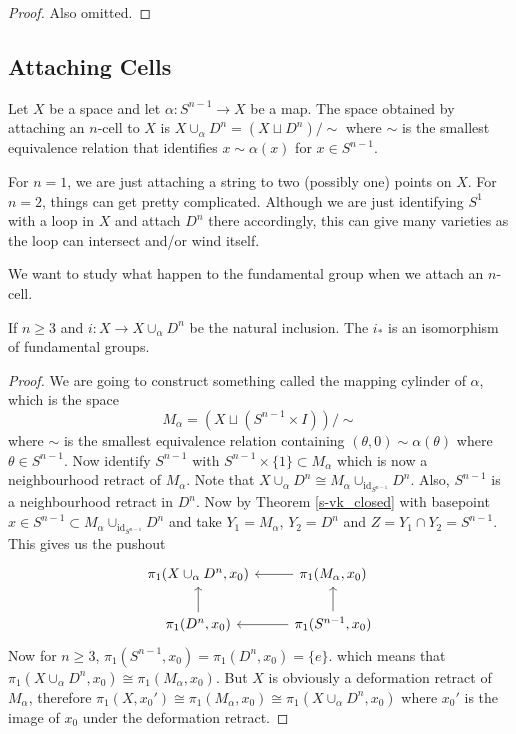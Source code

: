 \begin{proof}
    Also omitted.
\end{proof}
\subsection{Attaching Cells}
\begin{definition}
    Let $X$ be a space and let $\alpha:S^{n-1}\to X$ be a map.
    The space obtained by attaching an $n$-cell to $X$ is $X\cup_\alpha D^n=(X\sqcup D^n)/\sim$ where $\sim$ is the smallest equivalence relation that identifies $x\sim \alpha(x)$ for $x\in S^{n-1}$.
\end{definition}
\begin{example}
    For $n=1$, we are just attaching a string to two (possibly one) points on $X$.
    For $n=2$, things can get pretty complicated.
    Although we are just identifying $S^1$ with a loop in $X$ and attach $D^n$ there accordingly, this can give many varieties as the loop can intersect and/or wind itself.
\end{example}
We want to study what happen to the fundamental group when we attach an $n$-cell.
\begin{lemma}
    If $n\ge 3$ and $i:X\to X\cup_\alpha D^n$ be the natural inclusion.
    The $i_\ast$ is an isomorphism of fundamental groups.
\end{lemma}
\begin{proof}
    We are going to construct something called the mapping cylinder of $\alpha$, which is the space
    $$M_\alpha=(X\sqcup(S^{n-1}\times I))/\sim$$
    where $\sim$ is the smallest equivalence relation containing $(\theta,0)\sim\alpha(\theta)$ where $\theta\in S^{n-1}$.
    Now identify $S^{n-1}$ with $S^{n-1}\times \{1\}\subset M_\alpha$ which is now a neighbourhood retract of $M_\alpha$.
    Note that $X\cup_\alpha D^n\cong M_\alpha\cup_{\operatorname{id}_{S^{n-1}}}D^n$.
    Also, $S^{n-1}$ is a neighbourhood retract in $D^n$.
    Now by Theorem \ref{s-vk_closed} with basepoint $x\in S^{n-1}\subset M_\alpha\cup_{\operatorname{id}_{S^{n-1}}}D^n$ and take $Y_1=M_\alpha$, $Y_2=D^n$ and $Z=Y_1\cap Y_2=S^{n-1}$.
    This gives us the pushout
    \[
        \begin{tikzcd}
            \pi_1(X\cup_\alpha D^n,x_0)&\pi_1(M_\alpha,x_0)\arrow{l}\\
            \pi_1(D^n,x_0)\arrow{u}&\pi_1(S^{n-1},x_0)\arrow{u}\arrow{l}
        \end{tikzcd}
    \]
    Now for $n\ge 3$, $\pi_1(S^{n-1},x_0)=\pi_1(D^n,x_0)=\{e\}$.
    which means that $\pi_1(X\cup_\alpha D^n,x_0)\cong\pi_1(M_\alpha,x_0)$.
    But $X$ is obviously a deformation retract of $M_\alpha$, therefore $\pi_1(X,x_0')\cong\pi_1(M_\alpha,x_0)\cong\pi_1(X\cup_\alpha D^n,x_0)$ where $x_0'$ is the image of $x_0$ under the deformation retract.
\end{proof}

